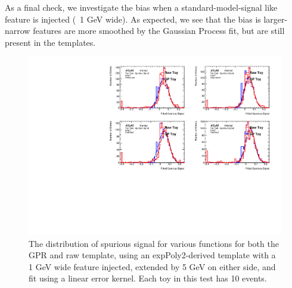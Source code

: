 As a final check, we investigate the bias when a standard-model-signal like feature is injected (~1 GeV wide). As expected, we see that the bias is larger- narrow features are more smoothed by the Gaussian Process fit, but are still present in the templates.

\begin{figure}  
\begin{center}
  \includegraphics[width=\textwidth]{figures/background/gpr/validation/linear/ToyTest_FitSigVals_lowpT_10_Sig_1s}   
\caption{The distribution of spurious signal for various functions for both the GPR and raw template, using an expPoly2-derived template with a 1 GeV wide feature injected, extended by 5 GeV on either side, and fit using a linear error kernel. Each toy in this test has 10 events.}
\label{fig:linearkernel_lowpt_10_Sig_1s}
\end{center}
\end{figure}

